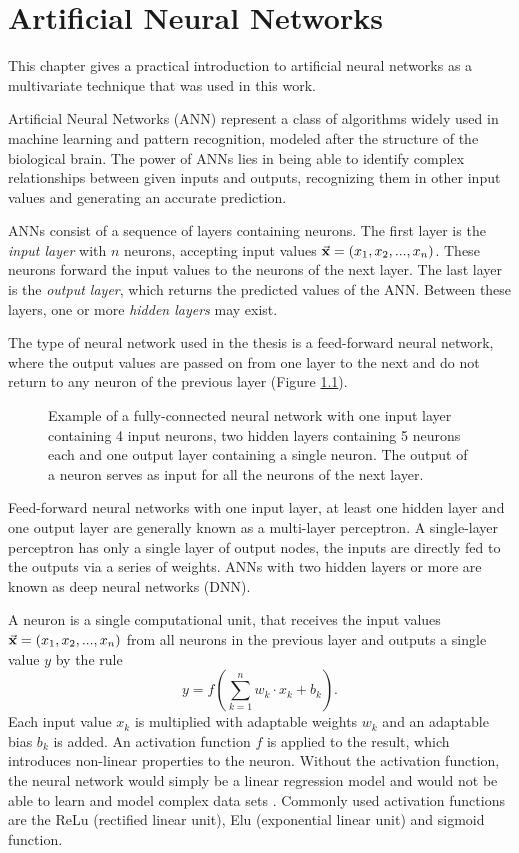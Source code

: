 \chapter{Artificial Neural Networks}
\label{ch:nn_mva}
This chapter gives a practical introduction to artificial neural networks as a multivariate technique that was used in this work.

Artificial Neural Networks (ANN) represent a class of algorithms widely used in machine learning and pattern recognition, modeled after the structure of the biological brain. The power of ANNs lies in being able to identify complex relationships between given inputs and outputs, recognizing them in other input values and generating an accurate prediction.

ANNs consist of a sequence of layers containing neurons. The first layer is the \emph{input layer} with $n$ neurons, accepting input values $\va{x}=(x_1,x_2,...,x_n)$. These neurons forward the input values to the neurons of the next layer. The last layer is the \emph{output layer}, which returns the predicted values of the ANN. Between these layers, one or more \emph{hidden layers} may exist.

The type of neural network used in the thesis is a feed-forward neural network, where the output values are passed on from one layer to the next and do not return to any neuron of the previous layer (Figure \ref{fig:neural_network}).

\begin{figure}[h]
    \centering
    
    \caption{Example of a fully-connected neural network with one input layer containing 4 input neurons, two hidden layers containing 5 neurons each and one output layer containing a single neuron. The output of a neuron serves as input for all the neurons of the next layer.}
    \label{fig:neural_network}
\end{figure}

Feed-forward neural networks with one input layer, at least one hidden layer and one output layer are generally known as a multi-layer perceptron. A single-layer perceptron has only a single layer of output nodes, the inputs are directly fed to the outputs via a series of weights. ANNs with two hidden layers or more are known as deep neural networks (DNN).

A neuron is a single computational unit, that receives the input values $\va{x}=(x_1,x_2,...,x_n)$ from all neurons in the previous layer and outputs a single value $y$ by the rule
\begin{equation}
    y=f\left( \sum_{k=1}^{n} w_k \cdot x_k + b_k \right).
\end{equation}
Each input value $x_k$ is multiplied with adaptable weights $w_k$ and an adaptable bias $b_k$ is added. An activation function $f$ is applied to the result, which introduces non-linear properties to the neuron. Without the activation function, the neural network would simply be a linear regression model and would not be able to learn and model complex data sets \cite{activationfunctions}. Commonly used activation functions are the ReLu (rectified linear unit), Elu (exponential linear unit) and sigmoid function.

